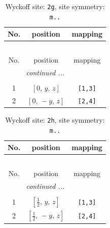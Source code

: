 \documentclass[fleqn,8pt]{jsarticle}
\begin{document}
\renewcommand{\arraystretch}{1.2}
\begin{longtable}{ccc}
\caption{Wyckoff site: {\tt 2g}, site symmetry: {\tt m..}}
 \\
 \hline \hline
No. & position & mapping \\ \hline \endfirsthead

\multicolumn{2}{l}{\tablename\ \thetable{}} \\
 \hline \hline
No. & position & mapping \\ \hline \endhead

 \hline \hline
\multicolumn{2}{r}{\footnotesize\it continued ...} \\ \endfoot

 \hline \hline
\multicolumn{2}{r}{} \\ \endlastfoot

1 & $\left[ 0,\, y,\, z \right]$ & {\tt [1,3]} \\ \hline
2 & $\left[ 0,\, - y,\, z \right]$ & {\tt [2,4]} \\
\end{longtable}
\renewcommand{\arraystretch}{1.2}
\begin{longtable}{ccc}
\caption{Wyckoff site: {\tt 2h}, site symmetry: {\tt m..}}
 \\
 \hline \hline
No. & position & mapping \\ \hline \endfirsthead

\multicolumn{2}{l}{\tablename\ \thetable{}} \\
 \hline \hline
No. & position & mapping \\ \hline \endhead

 \hline \hline
\multicolumn{2}{r}{\footnotesize\it continued ...} \\ \endfoot

 \hline \hline
\multicolumn{2}{r}{} \\ \endlastfoot

1 & $\left[ \frac{1}{2},\, y,\, z \right]$ & {\tt [1,3]} \\ \hline
2 & $\left[ \frac{1}{2},\, - y,\, z \right]$ & {\tt [2,4]} \\
\end{longtable}
\renewcommand{\arraystretch}{1.2}
\end{document}
